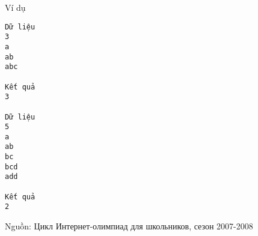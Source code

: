 Ví dụ
\begin{verbatim}
Dữ liệu
3
a
ab
abc

Kết quả
3

Dữ liệu
5
a
ab
bc
bcd
add

Kết quả
2
\end{verbatim}

   Nguồn: Цикл Интернет-олимпиад для школьников, сезон 2007-2008